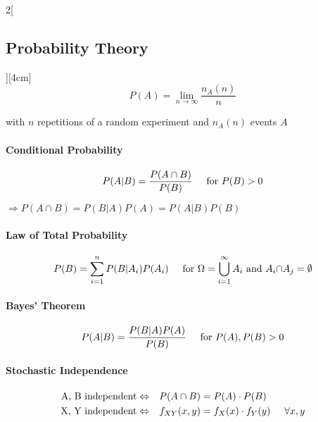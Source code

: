 \documentclass[8pt]{extarticle}
\begin{document}
\begin{multicols}{2}[\subsection{Probability Theory}][4cm]
$$P(A) = \lim\limits_{n \to \infty}\frac{n_A(n)}{n}$$

\noindent with $n$ repetitions of a random experiment and $n_A(n)$ events $A$

\paragraph{Conditional Probability}

$$P(A|B)=\frac{P(A \cap B)}{P(B)} \hspace{0.5cm} \text{for } P(B) > 0$$


$ \Rightarrow P(A \cap B)=P(B|A)P(A)=P(A|B)P(B)$

\paragraph{Law of Total Probability}

$$P(B)=\sum\limits_{i=1}^nP(B|A_i)P(A_i) \hspace{0.5cm}\text{for } \Omega=\bigcup_{i=1}^{\infty}{A_i} \text{ and } A_i {\cap} A_j = \emptyset$$

\paragraph{Bayes' Theorem}

$$P(A|B)=\frac{P(B|A)P(A)}{P(B)} \hspace{0.5cm} \text{for } P(A), P(B) > 0$$

\paragraph{Stochastic Independence}

\begin{alignat*}{2}
 \text{A, B independent}  \Leftrightarrow  && P(A\cap B) &= P(A)\cdot P(B) \\
 \text{X, Y independent}  \Leftrightarrow && f_{XY}(x,y) &= f_X(x)\cdot f_Y(y) \hspace{0.5cm} \forall x,y
\end{alignat*}

\end{multicols}
\end{document}
